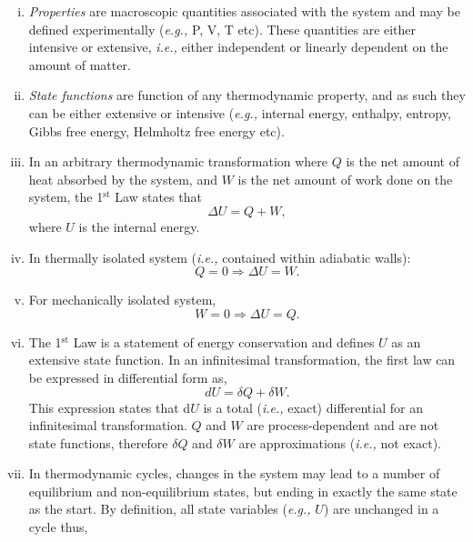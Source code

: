 \documentclass[12pts,a4paper,amsmath,amssymb,floatfix]{article}%
\newcommand{\eg}{{\it e.g., }}
\newcommand{\ie}{{\it i.e., }}
\begin{document}
\begin{enumerate}[i)]
%
      \item {\it Properties} are macroscopic quantities associated with the system and may be defined experimentally (\eg P, V, T etc). These quantities are either intensive or extensive, \ie either independent or linearly dependent on the amount of matter.
%
      \item {\it State functions} are function of any thermodynamic property, and as such they can be either extensive or intensive (\eg internal energy, enthalpy, entropy, Gibbs free energy, Helmholtz free energy etc).
%
      \item In an arbitrary thermodynamic transformation where $Q$ is the net amount of heat absorbed by the system, and $W$ is the net amount of work done on the system, the 1$^{\text{st}}$ Law states that
          \begin{displaymath}
             \Delta U = Q + W,
          \end{displaymath}
where $U$ is the internal energy.
%
      \item In thermally isolated system (\ie contained within adiabatic walls):
          \begin{displaymath}
             Q = 0 \Longrightarrow \Delta U = W. 
          \end{displaymath}
%
      \item For mechanically isolated system,
          \begin{displaymath}
             W = 0 \Longrightarrow \Delta U = Q.
          \end{displaymath}
%
      \item The 1$^{\text{st}}$ Law is a statement of energy conservation and defines $U$ as an extensive state function. In an infinitesimal transformation, the first law can be expressed in differential form as,
          \begin{displaymath}
             dU = \delta Q + \delta W.
          \end{displaymath}
This expression states that d$U$ is a total (\ie exact) differential for an infinitesimal transformation. $Q$ and $W$ are process-dependent and are not state functions, therefore $\delta Q$ and $\delta W$ are approximations (\ie not exact). 
%
      \item In thermodynamic cycles, changes in the system may lead to a number of equilibrium and non-equilibrium states, but ending in exactly the same state as the start. By definition, all state variables (\eg $U$) are unchanged in a cycle thus,
          \begin{displaymath}

\end{displaymath}
\end{enumerate}
\end{document}
